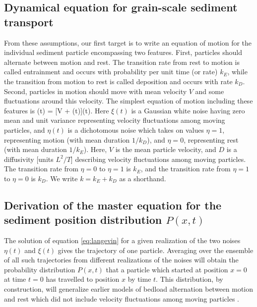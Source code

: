 \subsection{Dynamical equation for grain-scale sediment transport}
From these assumptions, our first target is to write an equation of motion for the individual sediment particle encompassing two features. First, particles should alternate between motion and rest. The transition rate from rest to motion is called entrainment and occurs with probability per unit time (or rate) $k_E$, while the transition from motion to rest is called deposition and occurs with rate $k_D$. Second, particles in motion should move with mean velocity $V$ and some fluctuations around this velocity. 
The simplest equation of motion including these features is
\be {}(t) = [V + \xi(t)]\eta(t).  \label{eq:langevin} \ee
Here $\xi(t)$ is a Gaussian white noise having zero mean and unit variance representing velocity fluctuations among moving particles, and $\eta(t)$ is a dichotomous noise which takes on values $\eta = 1$, representing motion (with mean duration $1/k_D$), and $\eta=0$, representing rest (with mean duration $1/k_E$). Here, $V$ is the mean particle velocity, and $D$ is a diffusivity [units $L^2/T$] describing velocity fluctuations among moving particles. The transition rate from $\eta=0$ to $\eta = 1$ is $k_E$, and the transition rate from $\eta=1$ to $\eta= 0$ is $k_D$. We write $k=k_E+k_D$ as a shorthand. 

\subsection{Derivation of the master equation for the sediment position distribution $P(x,t)$}
The solution of equation \ref{eq:langevin} for a given realization of the two noises $\eta(t)$ and $\xi(t)$ gives the trajectory of one particle. Averaging over the ensemble of all such trajectories from different realizations of the noises will obtain the probability distribution $P(x,t)$ that a particle which started at position $x=0$ at time $t=0$ has travelled to position $x$ by time $t$. This distribution, by construction, will generalize earlier models of bedload alternation between motion and rest which did not include velocity fluctuations among moving particles \citep{Lisle1998,Lajeunesse2017}.

